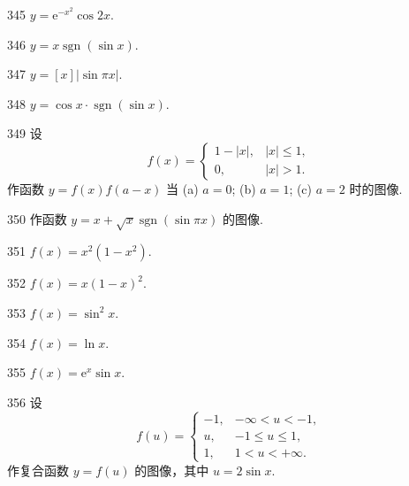 \begin{prob}[S]{345}
$y = \mathrm{e}^{-x^2} \cos 2x$.
\end{prob}

\begin{prob}[S]{346}
$y = x \operatorname{sgn}(\sin x)$.
\end{prob}

\begin{prob}[S]{347}
$y = [x] |\sin \pi x|$.
\end{prob}

\begin{prob}[S]{348}
$y = \cos x \cdot \operatorname{sgn}(\sin x)$.
\end{prob}

\begin{prob}[L]{349}
设
\[
f(x) = \begin{cases}
1 - |x|, & |x| \leqslant 1, \\
0, & |x| > 1.
\end{cases}
\]
作函数 $y = f(x) f(a - x)$ 当 (a) $a = 0$; (b) $a = 1$; (c) $a = 2$ 时的图像.
\end{prob}

\begin{prob}[M]{350}
作函数 $y = x + \sqrt{x} \operatorname{sgn}(\sin \pi x)$ 的图像.
\end{prob}


\begin{prob}[S]{351}
$f(x) = x^2(1 - x^2)$.
\end{prob}

\begin{prob}[S]{352}
$f(x) = x(1 - x)^2$.
\end{prob}

\begin{prob}[S]{353}
$f(x) = \sin^2 x$.
\end{prob}

\begin{prob}[S]{354}
$f(x) = \ln x$.
\end{prob}

\begin{prob}[S]{355}
$f(x) = \mathrm{e}^x \sin x$.
\end{prob}

\begin{prob}[M]{356}
设
\[
f(u) = \begin{cases}
-1, & -\infty < u < -1, \\
u, & -1 \leqslant u \leqslant 1, \\
1, & 1 < u < +\infty.
\end{cases}
\]
作复合函数 $y = f(u)$ 的图像，其中 $u = 2\sin x$.
\end{prob}

